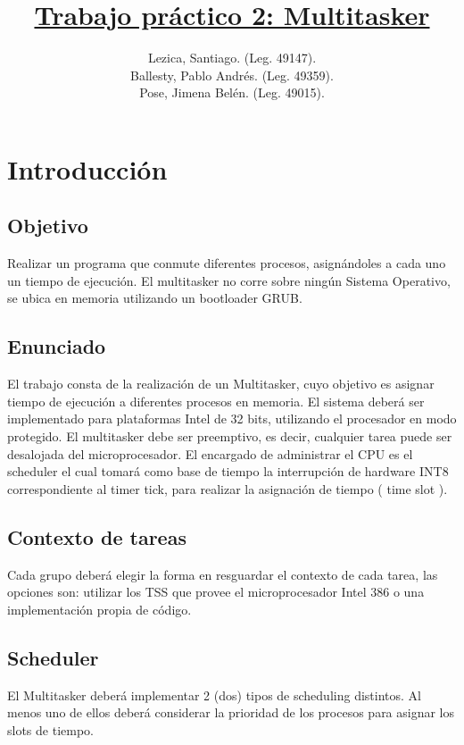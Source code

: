 \documentclass[a4paper,10pt]{article}
\title{\underline{\textbf{Trabajo práctico 2: Multitasker}}}
\author{
Lezica, Santiago. (Leg. 49147).\\
Ballesty, Pablo Andrés. (Leg. 49359).\\
Pose, Jimena Belén. (Leg. 49015).\\
}
\date{}
\begin{document}
\maketitle

\newpage
\tableofcontents

\newpage
\section{Introducción}
\subsection{Objetivo}
Realizar un programa que conmute diferentes procesos, asignándoles a cada 
uno un tiempo de ejecución. El multitasker no corre sobre ningún Sistema 
Operativo, se ubica en memoria utilizando un bootloader GRUB.


\subsection{Enunciado}
El trabajo consta de la realización de un Multitasker, cuyo objetivo es asignar
tiempo de ejecución a diferentes procesos en memoria. El sistema deberá ser
implementado para plataformas Intel de 32 bits, utilizando el procesador en
modo protegido. El multitasker debe ser preemptivo, es decir, cualquier tarea
puede ser desalojada del microprocesador. El encargado de administrar el CPU
es el scheduler el cual tomará como base de tiempo la interrupción de hardware
INT8 correspondiente al timer tick, para realizar la asignación de tiempo ( time
slot ).

\subsection{Contexto de tareas}
Cada grupo deberá elegir la forma en resguardar el contexto de cada tarea, las
opciones son: utilizar los TSS que provee el microprocesador Intel 386 o una
implementación propia de código.

\subsection{Scheduler}
El Multitasker deberá implementar 2 (dos) tipos de scheduling distintos. Al
menos uno de ellos deberá considerar la prioridad de los procesos para asignar
los slots de tiempo.
\end{document}
